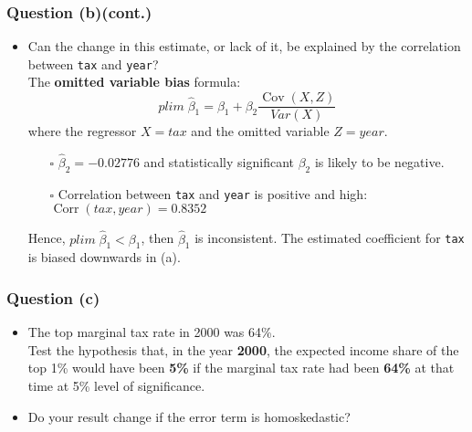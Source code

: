 \documentclass[11pt, xcolor=x11names,compress]{beamer}
\DeclareMathOperator{\Cov}{\text{Cov}}
\DeclareMathOperator{\Corr}{\text{Corr}}
\begin{document}
\begin{frame}
\frametitle{Question (b)(cont.)}
\begin{itemize}
    \item Can the change in this estimate, or lack of it, be explained by the correlation between \texttt{tax} and \texttt{year}?\\
\pause
\vspace{5mm}
    The \textbf{omitted variable bias} formula:
\begin{equation*}
    plim \;\widehat{\beta}_1  = \beta_1 + \beta_2 \frac{\Cov(X,Z)}{Var(X)}
\end{equation*}
\vspace{2mm}
where the regressor $X=tax$ and the omitted variable $Z=year$.\\
\vspace{2mm}
\begin{itemize}
    \item[$\square$] $\widehat{\beta}_2 = -0.02776$ and statistically significant \Rightarrow $\beta_2$ is likely to be negative.\\
    \item[$\square$] Correlation between \texttt{tax} and \texttt{year} is positive and high:\\
    \hspace{30mm}$\Corr(tax, year) = 0.8352$
\end{itemize}
\vspace{2mm}
Hence, $plim\;\widehat{\beta}_1 < \beta_1$, then $\widehat{\beta}_1$ is inconsistent. The estimated coefficient for \texttt{tax} is biased downwards in (a).
\end{itemize}
\end{frame}

\begin{frame}
\frametitle{Question (c)}\label{Back}
\begin{itemize}
    \item The top marginal tax rate in 2000 was 64\%. \\
    Test the hypothesis that, in the year \textbf{2000}, the expected income share of the top 1\% would have been \textbf{5\%} if the marginal tax rate had been \textbf{64\%} at that time at 5\% level of significance.\\ 
    \vspace{3mm}
    \item Do your result change if the error term is homoskedastic?\\
\end{itemize}
\hyperlink{Joint Hypotheses}{}
\end{frame}
\end{document}
